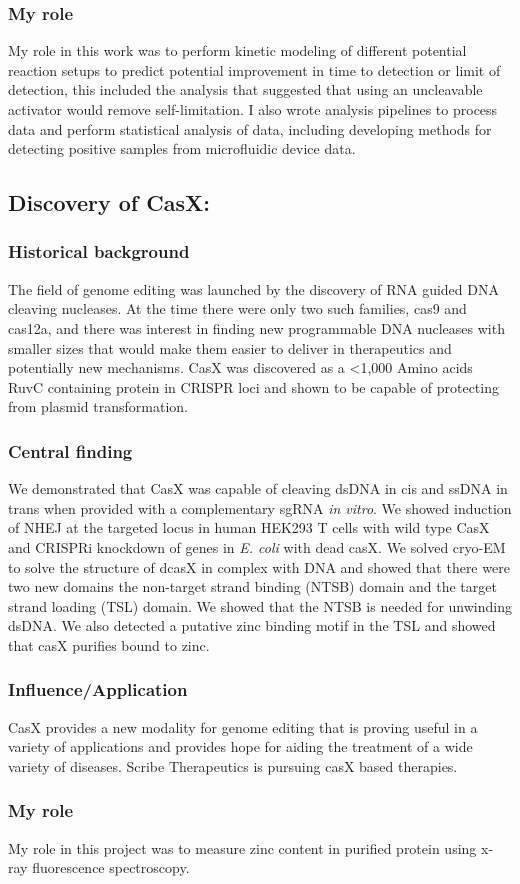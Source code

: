 \documentclass{article}
\begin{document}
\subsubsection{My role}
My role in this work was to perform kinetic modeling of different potential reaction setups to predict potential improvement in time to detection or limit of detection, this included the analysis that suggested that using an uncleavable activator would remove self-limitation.
I also wrote analysis pipelines to process data and perform statistical analysis of data, including developing methods for detecting positive samples from microfluidic device data.
%
\nocite{Liu2021-pu}
\printbibliography[heading=none]

\leavevmode\newline

\newrefsection
\subsection{Discovery of CasX:}
\subsubsection{Historical background}
The field of genome editing was launched by the discovery of RNA guided DNA cleaving nucleases.
At the time there were only two such families, cas9 and cas12a, and there was interest in finding new programmable DNA nucleases with smaller sizes that would make them easier to deliver in therapeutics and potentially new mechanisms.
CasX was discovered as a <1,000 Amino acids RuvC containing protein in CRISPR loci and shown to be capable of protecting from plasmid transformation.
%
\subsubsection{Central finding}
We demonstrated that CasX was capable of cleaving dsDNA in cis and ssDNA in trans when provided with a complementary sgRNA \textit{in vitro}.
We showed induction of NHEJ at the targeted locus in human HEK293 T cells with wild type CasX and CRISPRi knockdown of genes in \textit{E. coli} with dead casX.
We solved cryo-EM to solve the structure of dcasX in complex with DNA and showed that there were two new domains the non-target strand binding (NTSB) domain and the target strand loading (TSL) domain.
We showed that the NTSB is needed for unwinding dsDNA.
We also detected a putative zinc binding motif in the TSL and showed that casX purifies bound to zinc.
%
\subsubsection{Influence/Application}
CasX provides a new modality for genome editing that is proving useful in a variety of applications and provides hope for aiding the treatment of a wide variety of diseases.
Scribe Therapeutics is pursuing casX based therapies.
%
\subsubsection{My role}
My role in this project was to measure zinc content in purified protein using x-ray fluorescence spectroscopy.
%
\nocite{Liu2019-nk}
\printbibliography[heading=none]
\end{document}
